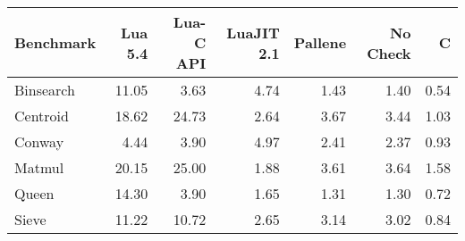 \begin{tabular}{lrrrrrr}
  \toprule
Benchmark & Lua 5.4 & Lua-C API & LuaJIT 2.1 & Pallene & No Check & C \\ 
  \midrule
Binsearch & 11.05 & 3.63 & 4.74 & 1.43 & 1.40 & 0.54 \\ 
  Centroid & 18.62 & 24.73 & 2.64 & 3.67 & 3.44 & 1.03 \\ 
  Conway & 4.44 & 3.90 & 4.97 & 2.41 & 2.37 & 0.93 \\ 
  Matmul & 20.15 & 25.00 & 1.88 & 3.61 & 3.64 & 1.58 \\ 
  Queen & 14.30 & 3.90 & 1.65 & 1.31 & 1.30 & 0.72 \\ 
  Sieve & 11.22 & 10.72 & 2.65 & 3.14 & 3.02 & 0.84 \\ 
   \bottomrule
\end{tabular}
